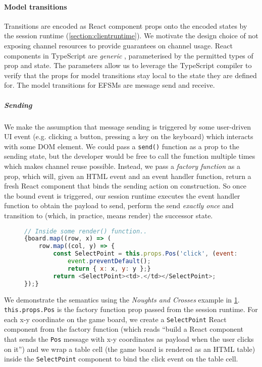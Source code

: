 \paragraph{Model transitions}
Transitions are encoded as React component props onto the encoded states by the
session runtime (\cref{section:clientruntime}).
We motivate the design choice of not exposing channel resources to provide
guarantees on channel usage.
React components in TypeScript are
\textit{generic} \cite{TypeScriptSpec}, parameterised by the permitted
types of prop and state.
The parameters allow us to leverage the TypeScript compiler to
verify that the props for model transitions stay local to the state they are
defined for.
The model transitions for EFSMs are message send and receive.

\subparagraph{Sending}
We make the assumption that message sending is triggered by
some user-driven UI event (e.g. clicking a button, pressing a key on the
keyboard) which interacts with some DOM element.
We could pass a
\texttt{send()} function as a prop to the sending state, but the developer
would be free to call the function multiple times which makes channel reuse
possible.
Instead, we pass a \textit{factory function} as a prop, which will,
given an HTML event and an event handler function, return a fresh React
component that binds the sending action on construction.
So once the bound event is triggered, our session runtime executes the event
handler function to obtain the payload to send, perform the send
\textit{exactly once} and transition to (which, in practice, means render) the
successor state.

\begin{figure}[!h]
\begin{lstlisting}[language=JavaScript, tabsize=4]
// Inside some render() function..
{board.map((row, x) => (
	row.map((col, y) => {
		const SelectPoint = this.props.Pos('click', (event: UIEvent) => {
			event.preventDefault();
			return { x: x, y: y };}
		return <SelectPoint><td>.</td></SelectPoint>;
});}
\end{lstlisting}
\label{lst:clientapp}
\end{figure}

We demonstrate the semantics using the \textit{Noughts and Crosses} example in
\cref{lst:clientapp}.
\texttt{this.props.Pos} is the factory function prop
passed from the session runtime.
For each x-y coordinate on the game board, we
create a \texttt{SelectPoint} React component from the factory function (which
reads ``build a React component that sends the \texttt{Pos} message with x-y
coordinates as payload when the user clicks on it'') and we wrap a table cell
(the game board is rendered as an HTML table) inside the \texttt{SelectPoint}
component to bind the click event on the table cell.

